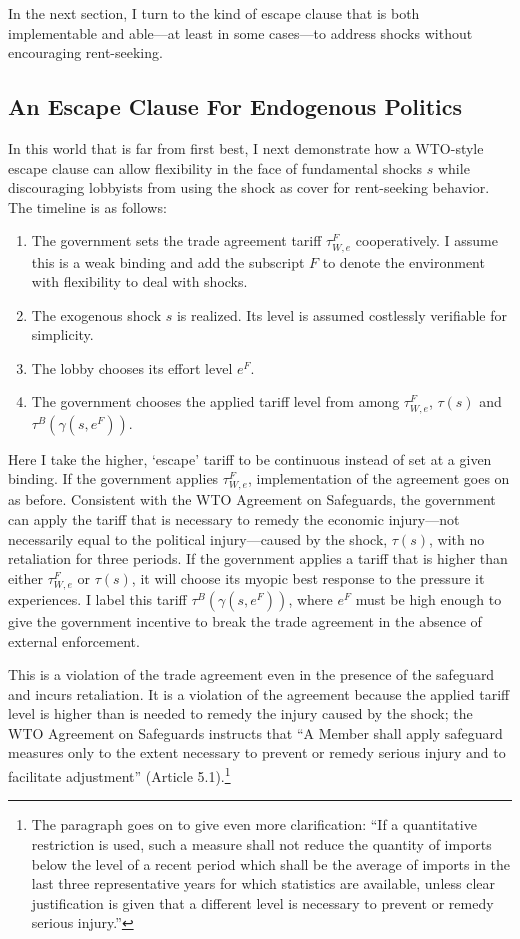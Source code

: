 \documentclass[12pt]{article}
\newcommand{\ga}{\gamma}
\begin{document}
In the next section, I turn to the kind of escape clause that is both implementable and able---at least in some cases---to address shocks without encouraging rent-seeking.

\subsection{An Escape Clause For Endogenous Politics}
\label{sec:ECendog}
In this world that is far from first best, I next demonstrate how a WTO-style escape clause can allow flexibility in the face of fundamental shocks $s$ while discouraging lobbyists from using the shock as cover for rent-seeking behavior. The timeline is as follows:
\begin{enumerate}
	\item The government sets the trade agreement tariff $\tau^F_{W,e}$ cooperatively. I assume this is a weak binding and add the subscript $F$ to denote the environment with flexibility to deal with shocks.
	\item The exogenous shock $s$ is realized. Its level is assumed costlessly verifiable for simplicity.
	\item The lobby chooses its effort level $e^F$.
	\item The government chooses the applied tariff level from among $\tau^F_{W,e}$, $\tau(s)$ and $\tau^B(\ga(s,e^F))$.
\end{enumerate}
Here I take the higher, `escape' tariff to be continuous instead of set at a given binding. If the government applies $\tau^F_{W,e}$, implementation of the agreement goes on as before. Consistent with the WTO Agreement on Safeguards, the government can apply the tariff that is necessary to remedy the economic injury---not necessarily equal to the political injury---caused by the shock, $\tau(s)$, with no retaliation for three periods. If the government applies a tariff that is higher than either $\tau^F_{W,e}$ or $\tau(s)$, it will choose its myopic best response to the pressure it experiences. I label this tariff $\tau^B(\ga(s,e^F))$, where $e^F$ must be high enough to give the government incentive to break the trade agreement in the absence of external enforcement.

This is a violation of the trade agreement even in the presence of the safeguard and incurs retaliation. It is a violation of the agreement because the applied tariff level is higher than is needed to remedy the injury caused by the shock; the WTO Agreement on Safeguards instructs that ``A Member shall apply safeguard measures only to the extent necessary to prevent or remedy serious injury and to facilitate adjustment'' (Article 5.1).\footnote{The paragraph goes on to give even more clarification: ``If a quantitative restriction is used, such a measure shall  not reduce the quantity of imports below the level of a recent period which shall be the average of imports in the last three representative years for which statistics are available, unless clear justification is given that a different level is necessary to prevent or remedy serious injury.''}
\end{document}
